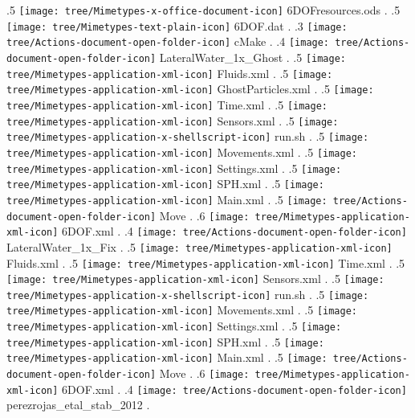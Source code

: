 {.5 { \texttt{[image: tree/Mimetypes-x-office-document-icon]} 6DOFresources.ods }.
.5 { \texttt{[image: tree/Mimetypes-text-plain-icon]} 6DOF.dat }.
.3 { \texttt{[image: tree/Actions-document-open-folder-icon]} cMake }.
.4 { \texttt{[image: tree/Actions-document-open-folder-icon]} LateralWater\_1x\_Ghost }.
.5 { \texttt{[image: tree/Mimetypes-application-xml-icon]} Fluids.xml }.
.5 { \texttt{[image: tree/Mimetypes-application-xml-icon]} GhostParticles.xml }.
.5 { \texttt{[image: tree/Mimetypes-application-xml-icon]} Time.xml }.
.5 { \texttt{[image: tree/Mimetypes-application-xml-icon]} Sensors.xml }.
.5 { \texttt{[image: tree/Mimetypes-application-x-shellscript-icon]} run.sh }.
.5 { \texttt{[image: tree/Mimetypes-application-xml-icon]} Movements.xml }.
.5 { \texttt{[image: tree/Mimetypes-application-xml-icon]} Settings.xml }.
.5 { \texttt{[image: tree/Mimetypes-application-xml-icon]} SPH.xml }.
.5 { \texttt{[image: tree/Mimetypes-application-xml-icon]} Main.xml }.
.5 { \texttt{[image: tree/Actions-document-open-folder-icon]} Move }.
.6 { \texttt{[image: tree/Mimetypes-application-xml-icon]} 6DOF.xml }.
.4 { \texttt{[image: tree/Actions-document-open-folder-icon]} LateralWater\_1x\_Fix }.
.5 { \texttt{[image: tree/Mimetypes-application-xml-icon]} Fluids.xml }.
.5 { \texttt{[image: tree/Mimetypes-application-xml-icon]} Time.xml }.
.5 { \texttt{[image: tree/Mimetypes-application-xml-icon]} Sensors.xml }.
.5 { \texttt{[image: tree/Mimetypes-application-x-shellscript-icon]} run.sh }.
.5 { \texttt{[image: tree/Mimetypes-application-xml-icon]} Movements.xml }.
.5 { \texttt{[image: tree/Mimetypes-application-xml-icon]} Settings.xml }.
.5 { \texttt{[image: tree/Mimetypes-application-xml-icon]} SPH.xml }.
.5 { \texttt{[image: tree/Mimetypes-application-xml-icon]} Main.xml }.
.5 { \texttt{[image: tree/Actions-document-open-folder-icon]} Move }.
.6 { \texttt{[image: tree/Mimetypes-application-xml-icon]} 6DOF.xml }.
.4 { \texttt{[image: tree/Actions-document-open-folder-icon]} perezrojas\_etal\_stab\_2012 }.
}
